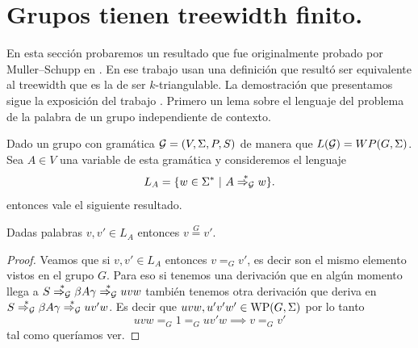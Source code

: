 \documentclass[tesis.tex]{subfiles}
\begin{document}
\section{Grupos \ic tienen treewidth finito.}\label{secc_MuSch}

En esta sección probaremos un resultado que fue originalmente probado por Muller--Schupp en \cite{muller1985theory}.
En ese trabajo usan una definición que resultó ser equivalente al treewidth que es la de ser $k$-triangulable.
La demostración que presentamos sigue la exposición del trabajo \cite{diekert2017context}.
Primero un lema sobre el lenguaje del problema de la palabra de un grupo independiente de contexto.


Dado un grupo \ic con gramática ${\cal G} = (V, \Sigma, P, S)$ de manera que $L({\cal G}) = WP(G,\Sigma)$.
Sea $A \in V$ una variable de esta gramática y consideremos el lenguaje
\[
	L_A = \{ w \in \Sigma^*  \ | \ A \overset{*}{\Rightarrow_{\cal G}} w  \}.
\]
entonces vale el siguiente resultado.
\begin{lema}\label{palabras-wp}
	Dadas palabras $v,v' \in L_{A}$ entonces $v \overset{G}{=} v'$.
\end{lema}

\begin{proof}
	Veamos que si $v,v' \in L_A$ entonces $v =_G v'$, es decir son el mismo elemento vistos en el grupo $G$. 
	Para eso si tenemos una derivación que en algún momento llega a $S \overset{*}{\Rightarrow_{\cal G}} \beta A \gamma \overset{*}{\Rightarrow_{\cal G}} uvw$ también tenemos otra derivación que deriva en $S \overset{*}{\Rightarrow_{\cal G}} \beta A \gamma  \overset{*}{\Rightarrow_{\cal G}} uv'w$. 
	Es decir que $uvw, u'v'w' \in \text{WP}(G, \Sigma)$ por lo tanto 
	\begin{equation*}
		uvw =_G 1 =_G uv'w \implies v =_G v'
	\end{equation*}
	tal como queríamos ver.
\end{proof}
\end{document}
